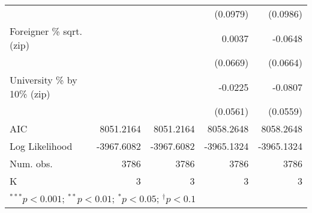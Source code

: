 \begin{tabular}{l D{.}{.}{5.7} D{.}{.}{5.7} D{.}{.}{5.7} D{.}{.}{5.7}}
                                  &               &               & (0.0979)      & (0.0986)      \\
Foreigner \% sqrt. (zip)          &               &               & 0.0037        & -0.0648       \\
                                  &               &               & (0.0669)      & (0.0664)      \\
University \% by 10\% (zip)       &               &               & -0.0225       & -0.0807       \\
                                  &               &               & (0.0561)      & (0.0559)      \\
\midrule
AIC                               & 8051.2164     & 8051.2164     & 8058.2648     & 8058.2648     \\
Log Likelihood                    & -3967.6082    & -3967.6082    & -3965.1324    & -3965.1324    \\
Num. obs.                         & 3786          & 3786          & 3786          & 3786          \\
K                                 & 3             & 3             & 3             & 3             \\
\bottomrule
{}
\end{tabular}
